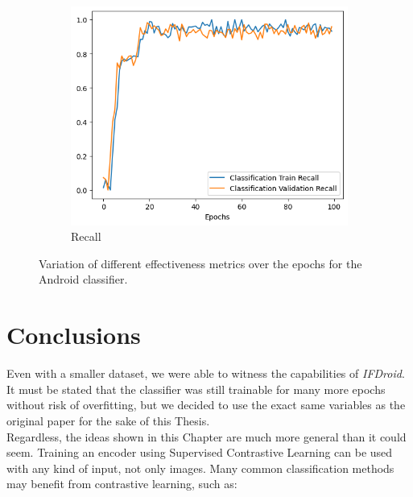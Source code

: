 \begin{figure}[H]
\begin{subfigure}{0.3\textwidth}
        \includegraphics[width=\linewidth]{Images/Rec_5.png}
        \caption{Recall}
        \label{fig:Recall}
    \end{subfigure}
    \caption{Variation of different effectiveness metrics over the epochs for the Android classifier.}
    \label{fig:Metrics}
\end{figure}

\section{Conclusions}
Even with a smaller dataset, we were able to witness the capabilities of \textit{IFDroid}. It must be stated that the classifier was still trainable for many more epochs without risk of overfitting, but we decided to use the exact same variables as the original paper for the sake of this Thesis. \\
Regardless, the ideas shown in this Chapter are much more general than it could seem. Training an encoder using Supervised Contrastive Learning can be used with any kind of input, not only images. Many common classification methods may benefit from contrastive learning, such as:

